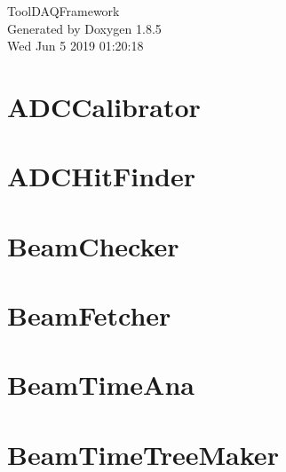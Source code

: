\documentclass[twoside]{book}
\newcommand{\clearemptydoublepage}{%
  \newpage{\pagestyle{empty}\cleardoublepage}%
}
\begin{document}
\hypersetup{pageanchor=false}
\begin{titlepage}
\vspace*{7cm}
\begin{center}%
{\Large Tool\-D\-A\-Q\-Framework }\\
\vspace*{1cm}
{\large Generated by Doxygen 1.8.5}\\
\vspace*{0.5cm}
{\small Wed Jun 5 2019 01:20:18}\\
\end{center}
\end{titlepage}
\clearemptydoublepage
\tableofcontents
\clearemptydoublepage
{}
\hypersetup{pageanchor=true}

\chapter{A\-D\-C\-Calibrator}
\label{md_UserTools_ADCCalibrator_README}
\hypertarget{md_UserTools_ADCCalibrator_README}{}

\chapter{A\-D\-C\-Hit\-Finder}
\label{md_UserTools_ADCHitFinder_README}
\hypertarget{md_UserTools_ADCHitFinder_README}{}

\chapter{Beam\-Checker}
\label{md_UserTools_BeamChecker_README}
\hypertarget{md_UserTools_BeamChecker_README}{}

\chapter{Beam\-Fetcher}
\label{md_UserTools_BeamFetcher_README}
\hypertarget{md_UserTools_BeamFetcher_README}{}

\chapter{Beam\-Time\-Ana}
\label{md_UserTools_BeamTimeAna_README}
\hypertarget{md_UserTools_BeamTimeAna_README}{}

\chapter{Beam\-Time\-Tree\-Maker}
\label{md_UserTools_BeamTimeTreeMaker_README}
\hypertarget{md_UserTools_BeamTimeTreeMaker_README}{}

\end{document}
